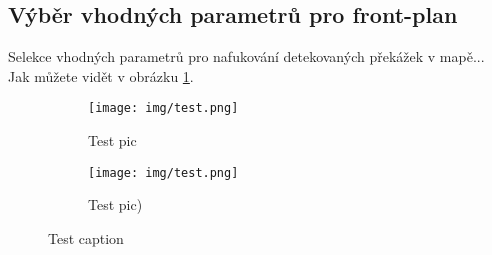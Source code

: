 \documentclass[twoside]{article}
\begin{document}
\subsection{Výběr vhodných parametrů pro front-plan}
	Selekce vhodných parametrů pro nafukování detekovaných překážek v mapě...\\
	Jak můžete vidět v obrázku \ref{fig:front_plan}.
	\begin{figure}[!h]
     \centering
     \begin{subfigure}[b]{0.45\textwidth}
         \centering
         \texttt{[image: img/test.png]}
         \caption{Test pic}
     \end{subfigure}
     \begin{subfigure}[b]{0.45\textwidth}
         \centering
         \texttt{[image: img/test.png]}
         \caption{Test pic)}
         
     \end{subfigure}
        \caption{Test caption}
        \label{fig:front_plan}
	\end{figure}
\end{document}
